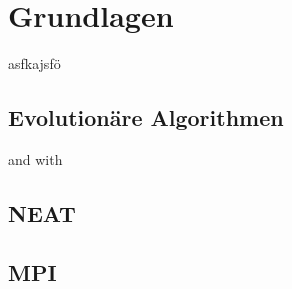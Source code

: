 \chapter{Grundlagen}




\newpage
asfkajsfö
\section{Evolutionäre Algorithmen}
 and \cite{stanley2002evolving} with \citeauthor{stanley2002evolving}
\section{NEAT}
\section{MPI}